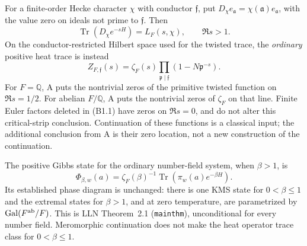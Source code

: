 \begin{proposition}
\label{AC-B01}
For a finite-order Hecke character $\chi$ with conductor $\mathfrak f$,
put $D_\chi e_{\mathfrak a}=\chi(\mathfrak a)e_{\mathfrak a}$, with
the value zero on ideals not prime to $\mathfrak f$. Then
\[
 \operatorname{Tr}(D_\chi e^{-sH})=L_F(s,\chi),\qquad \Re s>1.
\]
On the conductor-restricted Hilbert space used for the twisted trace,
the \emph{ordinary} positive heat trace is instead
\[
 Z_{F,\mathfrak f}(s)=
 \zeta_F(s)\prod_{\mathfrak p\mid\mathfrak f}
                      (1-N\mathfrak p^{-s}).                 \tag{B1.1}
\]
For $F=\mathbb Q$, A puts the nontrivial zeros of the primitive
twisted function on $\Re s=1/2$. For abelian $F/\mathbb Q$, A puts
the nontrivial zeros of $\zeta_F$ on that line. Finite Euler factors
deleted in (B1.1) have zeros on $\Re s=0$, and do not alter this
critical-strip conclusion. Continuation of these functions is a
classical input; the additional conclusion from A is their zero
location, not a new construction of the continuation.

The positive Gibbs state for the ordinary number-field system, when
$\beta>1$, is
\[
 \Phi_{\beta,w}(a)=\zeta_F(\beta)^{-1}
                 \operatorname{Tr}(\pi_w(a)e^{-\beta H}).
\]
Its established phase diagram is unchanged: there is one KMS state
for $0<\beta\le1$ and the extremal states for $\beta>1$, and at
zero temperature, are parametrized by
$\operatorname{Gal}(F^{\rm ab}/F)$. This is LLN Theorem~2.1
(\texttt{mainthm}), unconditional for every number field.
Meromorphic continuation does not make the heat operator trace
class for $0<\beta\le1$.
\end{proposition}
